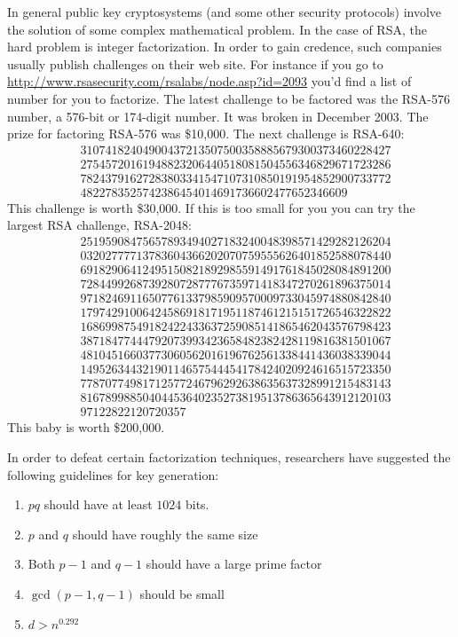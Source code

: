 In general public key cryptosystems
(and some other security protocols)
involve the solution of some complex
mathematical problem. In the case of RSA, the hard problem is
integer factorization. In order to gain credence, such companies
usually publish challenges on their web site. For instance if you
go to
\url{http://www.rsasecurity.com/rsalabs/node.asp?id=2093}
you'd find a list of number for you to factorize. The latest
challenge to be factored was the RSA-576 number, a 576-bit or
174-digit number. It was broken in December 2003. The prize for
factoring RSA-576 was \$10,000. The next challenge is RSA-640:
\begin{align*}
 & 31074 18240 49004 37213 50750 03588 85679 30037 34602 28427 \\
 & 27545 72016 19488 23206 44051 80815 04556 34682 96717 23286 \\
 & 78243 79162 72838 03341 54710 73108 50191 95485 29007 33772 \\
 & 48227 83525 74238 64540 14691 73660 24776 5234 6609
\end{align*}
This challenge is worth \$30,000. If this is too small for you you
can try the largest RSA challenge, RSA-2048:
\begin{align*}
& 25195908475657893494027183240048398571429282126204 \\
& 03202777713783604366202070759555626401852588078440 \\
& 69182906412495150821892985591491761845028084891200 \\
& 72844992687392807287776735971418347270261896375014 \\
& 97182469116507761337985909570009733045974880842840 \\
& 17974291006424586918171951187461215151726546322822 \\
& 16869987549182422433637259085141865462043576798423 \\
& 38718477444792073993423658482382428119816381501067 \\
& 48104516603773060562016196762561338441436038339044 \\
& 14952634432190114657544454178424020924616515723350 \\
& 77870774981712577246796292638635637328991215483143 \\
& 81678998850404453640235273819513786365643912120103 \\
& 97122822120720357
\end{align*}
This baby is worth \$200,000.


In order to defeat certain factorization techniques, researchers
have suggested the following guidelines for key generation:
\begin{enumerate}
 \item $pq$ should have at least $1024$ bits.
 \item $p$ and $q$ should have roughly the same size
 \item Both $p-1$ and $q-1$ should have a large prime factor
 \item $\gcd(p-1,q-1)$ should be small
 \item $d > n^{0.292}$
\end{enumerate}

